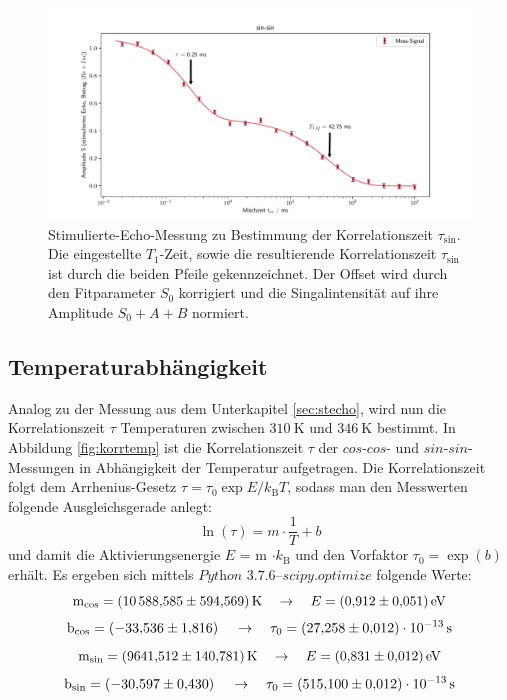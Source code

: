 \begin{figure}[H]
    \centering
    \includegraphics[width=\textwidth]{Auswertung/Para_der_Korrfkt/sin_sin.pdf}
    \caption{Stimulierte-Echo-Messung zu Bestimmung der Korrelationszeit
    $\tau_{\text{sin}}$. Die eingestellte $T_1$-Zeit, sowie die resultierende
    Korrelationszeit $\tau_{\text{sin}}$ ist durch die beiden Pfeile gekennzeichnet.
    Der Offset wird durch den Fitparameter $S_0$ korrigiert und die
    Singalintensität auf ihre Amplitude $S_0+A+B$ normiert.}
    \label{fig:sin-sin}
\end{figure}

\subsection{Temperaturabhängigkeit}
\label{sec:tempabh}
Analog zu der Messung aus dem Unterkapitel \ref{sec:stecho}, wird nun die
Korrelationszeit $\tau$ Temperaturen zwischen $\SI{310}{\kelvin}$
und $\SI{346}{\kelvin}$ bestimmt. In Abbildung \ref{fig:korrtemp}
ist die Korrelationszeit $\tau$ der $cos$-$cos$- und $sin$-$sin$-Messungen
in Abhängigkeit der Temperatur aufgetragen. Die Korrelationszeit folgt
dem Arrhenius-Gesetz $\tau = \tau_0 \exp{E/k_{\text{B}}T}$, sodass man den Messwerten
folgende Ausgleichsgerade anlegt:
\begin{equation*}
  \ln{(\tau)} = m \cdot \frac{1}{T} + b
\end{equation*}
\noindent
und damit die Aktivierungsenergie $E$ = m $\cdot k_{\text{B}}$ und den Vorfaktor $\tau_0 = \exp{(b)}$ erhält. Es ergeben sich mittels
$\textit{Python 3.7.6--scipy.optimize}$ folgende Werte:
\begin{equation*}
  \text{m}_{\text{cos}} = \SI{10588,585\pm594,569}{\kelvin}
  \quad\rightarrow\quad
  E = \SI{0.912\pm0.051}{\electronvolt}
\end{equation*}
\begin{equation*}
  \text{b}_{\text{cos}} = \SI{-33,536\pm1,816}
  \quad\rightarrow\quad
  \tau_0 = \SI{27,258\pm0.012 e-13}{\second}
\end{equation*}
\begin{equation*}
  \text{m}_{\text{sin}} = \SI{9641,512\pm140,781}{\kelvin}
  \quad\rightarrow\quad
  E = \SI{0.831\pm0.012}{\electronvolt}
\end{equation*}
\begin{equation*}
  \text{b}_{\text{sin}} = \SI{-30,597\pm0.430}
  \quad\rightarrow\quad
  \tau_0 = \SI{515,100\pm0.012 e-13}{\second}
\end{equation*}

